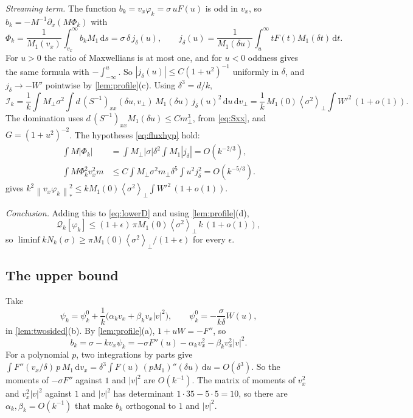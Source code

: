 \documentclass[11pt]{article}
\newcommand{\dd}{\,\mathrm d}
\newcommand{\av}[1]{\left\langle #1\right\rangle}
\newcommand{\nstar}[1]{\left\|#1\right\|_*}
\theoremstyle{definition}
\theoremstyle{remark}
\numberwithin{equation}{section}
\begin{document}
\emph{Streaming term.} The function $b_k=v_x\varphi_k=\sigma\,uF(u)$ is odd
in $v_x$, so $b_k=-M^{-1}\partial_x(M\Phi_k)$ with
\[
 \Phi_k=\frac1{M_1(v_x)}\int_{v_x}^\infty b_kM_1\dd s
   =\sigma\,\delta\,j_\delta(u),\qquad
 j_\delta(u)=\frac1{M_1(\delta u)}\int_u^\infty tF(t)M_1(\delta t)\dd t .
\]
For $u>0$ the ratio of Maxwellians is at most one, and for $u<0$ oddness
gives the same formula with $-\int_{-\infty}^u$. So
$|j_\delta(u)|\leq C(1+u^2)^{-1}$ uniformly in $\delta$, and
$j_\delta\to-W'$ pointwise by \cref{lem:profile}(c). Using
$\delta^3=d/k$,
\[
 \mathcal I_k=\frac1k\int M_\perp\sigma^2\!\int d\,(S^{-1})_{xx}(\delta u,v_\perp)\,
   M_1(\delta u)\,j_\delta(u)^2\dd u\dd v_\perp
 =\frac1k\,M_1(0)\av{\sigma^2}_\perp\!\int W'^2\,(1+o(1)).
\]
The domination uses $d\,(S^{-1})_{xx}M_1(\delta u)\leq Cm_\perp^3$, from
\eqref{eq:Sxx}, and $G=(1+u^2)^{-2}$. The hypotheses \eqref{eq:fluxhyp}
hold:
\begin{align*}
 \int M|\Phi_k|&=\int M_\perp|\sigma|\delta^2\!\int M_1|j_\delta|=O(k^{-2/3}),\\
 \int M\Phi_k^2v_x^2m&\leq C\!\int M_\perp\sigma^2m_\perp\delta^5\!\int u^2j_\delta^2
   =O(k^{-5/3}).
\end{align*}
 gives
$k^2\nstar{v_x\varphi_k}^2\leq kM_1(0)\av{\sigma^2}_\perp\int W'^2\,(1+o(1))$.

\emph{Conclusion.} Adding this to \eqref{eq:lowerD} and using
\cref{lem:profile}(d),
\begin{equation}
 \mathcal Q_k[\varphi_k]\leq(1+\epsilon)\,\pi M_1(0)\av{\sigma^2}_\perp\,k\,(1+o(1)),
 \label{eq:Qtrial}
\end{equation}
so $\liminf kN_k(\sigma)\geq\pi M_1(0)\av{\sigma^2}_\perp/(1+\epsilon)$ for
every $\epsilon$.

\subsection{The upper bound}

Take
\[
 \psi_k=\psi_k^0+\frac1k\bigl(\alpha_kv_x+\beta_kv_x|v|^2\bigr),\qquad
 \psi_k^0=-\frac{\sigma}{k\delta}W(u),
\]
in \cref{lem:twosided}(b). By \cref{lem:profile}(a), $1+uW=-F''$, so
\[
 b_k=\sigma-kv_x\psi_k=-\sigma F''(u)-\alpha_kv_x^2-\beta_kv_x^2|v|^2 .
\]
For a polynomial $p$, two integrations by parts give
$\int F''(v_x/\delta)\,p\,M_1\dd v_x
=\delta^3\!\int F(u)\,(pM_1)''(\delta u)\dd u=O(\delta^3)$. So the moments
of $-\sigma F''$ against $1$ and $|v|^2$ are $O(k^{-1})$. The matrix of
moments of $v_x^2$ and $v_x^2|v|^2$ against $1$ and $|v|^2$ has
determinant $1\cdot35-5\cdot5=10$, so there are
$\alpha_k,\beta_k=O(k^{-1})$ that make $b_k$ orthogonal to $1$ and
$|v|^2$.
\end{document}
